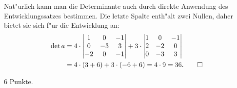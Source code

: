 \begin{loesung}
Nat"urlich kann man die Determinante auch durch direkte Anwendung des
Entwicklungssatzes bestimmen.
Die letzte Spalte enth"alt zwei Nullen, daher bietet sie sich f"ur die
Entwicklung an:
\begin{align*}
\det a
&=
4\cdot
\left|\begin{matrix}
 1& 0&-1\\
 0&-3& 3\\
-2& 0&-1
\end{matrix}\right|
+3\cdot
\left|\begin{matrix}
 1& 0&-1\\
 2&-2& 0\\
 0&-3& 3
\end{matrix}\right|
\\
&=
4\cdot(3+6)+3\cdot(-6+6)=4\cdot 9=36.
\qedhere
\end{align*}
\end{loesung}

\begin{bewertung}
6 Punkte.
\end{bewertung}

